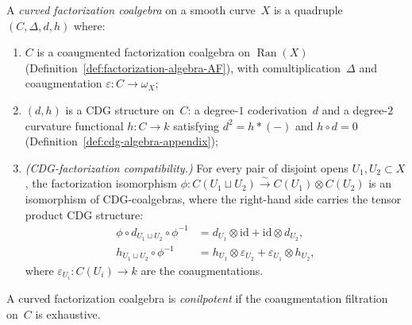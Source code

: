 \begin{definition}
\label{def:curved-fact-coalgebra}
A \emph{curved factorization coalgebra} on a smooth curve~$X$
is a quadruple $(C, \Delta, d, h)$ where:
\begin{enumerate}[label=\textup{(\roman*)}]
\item $C$ is a coaugmented factorization coalgebra on
 $\operatorname{Ran}(X)$
 (Definition~\ref{def:factorization-algebra-AF}), with
 comultiplication~$\Delta$ and coaugmentation
 $\varepsilon \colon C \to \omega_X$;
\item $(d, h)$ is a CDG structure on~$C$: a degree-$1$
 coderivation~$d$ and a degree-$2$ curvature functional
 $h \colon C \to k$ satisfying $d^2 = h \ast (-)$ and
 $h \circ d = 0$
 (Definition~\ref{def:cdg-algebra-appendix});
\item \emph{(CDG-factorization compatibility.)}
 For every pair of disjoint opens $U_1, U_2 \subset X$, the
 factorization isomorphism
 $\phi \colon C(U_1 \sqcup U_2) \xrightarrow{\;\sim\;}
 C(U_1) \otimes C(U_2)$
 is an isomorphism of CDG-coalgebras, where the right-hand
 side carries the tensor product CDG structure:
 \begin{equation}\label{eq:CDG-factorization-compatibility}
 \begin{aligned}
 \phi \circ d_{U_1 \sqcup U_2} \circ \phi^{-1}
 &= d_{U_1} \otimes \mathrm{id}
 + \mathrm{id} \otimes d_{U_2}, \\
 h_{U_1 \sqcup U_2} \circ \phi^{-1}
 &= h_{U_1} \otimes \varepsilon_{U_2}
 + \varepsilon_{U_1} \otimes h_{U_2},
 \end{aligned}
 \end{equation}
 where $\varepsilon_{U_i} \colon C(U_i) \to k$ are the
 coaugmentations.
\end{enumerate}
A curved factorization coalgebra is \emph{conilpotent} if
the coaugmentation filtration on~$C$ is exhaustive.
\end{definition}

